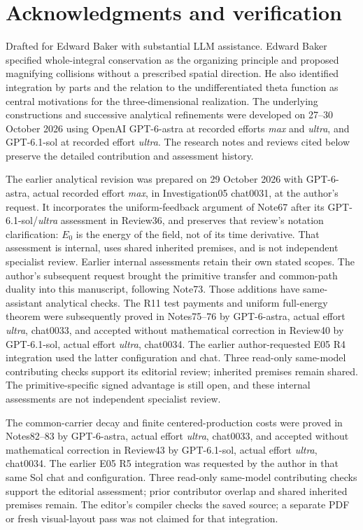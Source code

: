 \documentclass[11pt]{article}
\numberwithin{equation}{section}
\begin{document}
\section*{Acknowledgments and verification}

Drafted for Edward Baker with substantial LLM assistance.
Edward Baker specified whole-integral conservation as the organizing
principle and proposed magnifying collisions without a prescribed
spatial direction. He also identified integration by parts and the
relation to the undifferentiated theta function as central motivations
for the three-dimensional realization. The underlying constructions and successive
analytical refinements were developed on 27--30 October 2026 using
OpenAI GPT-6-astra at recorded efforts \emph{max} and \emph{ultra}, and GPT-6.1-sol at
recorded effort \emph{ultra}. The research notes and reviews cited
below preserve the detailed contribution and assessment history.

The earlier analytical revision was prepared on 29 October 2026 with
GPT-6-astra, actual recorded effort \emph{max}, in Investigation05
chat0031, at the author's request. It incorporates the uniform-feedback
argument of Note67 after its GPT-6.1-sol/\emph{ultra} assessment in
Review36, and preserves that review's notation clarification:
$E_0$ is the energy of the field, not of its time derivative.
That assessment is internal, uses shared inherited premises, and is
not independent specialist review. Earlier internal assessments
retain their own stated scopes. The author's subsequent request brought
the primitive transfer and common-path duality into this manuscript,
following Note73. Those additions have same-assistant analytical checks.
The R11 test payments and uniform full-energy theorem were subsequently
proved in Notes75--76 by GPT-6-astra, actual effort \emph{ultra},
chat0033, and accepted without mathematical correction in Review40 by
GPT-6.1-sol, actual effort \emph{ultra}, chat0034. The earlier author-requested
E05 R4 integration used the latter configuration and chat. Three
read-only same-model contributing checks support its editorial review;
inherited premises remain shared. The primitive-specific signed
advantage is still open, and these internal assessments are not
independent specialist review.

The common-carrier decay and finite centered-production costs were proved
in Notes82--83 by GPT-6-astra, actual effort \emph{ultra}, chat0033,
and accepted without mathematical correction in Review43 by
GPT-6.1-sol, actual effort \emph{ultra}, chat0034. The earlier
E05 R5 integration was requested by the author in that same Sol chat
and configuration. Three read-only same-model contributing checks
support the editorial assessment; prior contributor overlap and shared
inherited premises remain. The editor's compiler checks the saved source;
a separate PDF or fresh visual-layout pass was not claimed for that integration.
\end{document}
